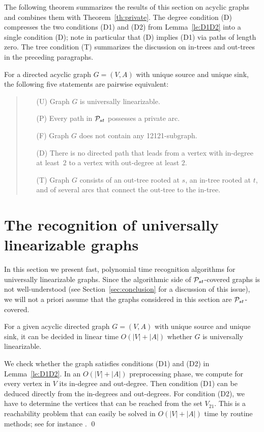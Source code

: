 \documentclass[11pt,fleqn]{article}
\begin{document}
\bigskip
The following theorem summarizes the results of this section on acyclic graphs and 
combines them with Theorem~\ref{th:private}.
The degree condition (D) compresses the two conditions (D1) and (D2) from Lemma~\ref{le:D1D2} into 
a single condition (D); note in particular that (D) implies (D1) via paths of length zero.
The tree condition (T) summarizes the discussion on in-trees and out-trees in the preceding paragraphs.
\begin{theorem}
\label{th:acyclic}
For a directed acyclic graph $G=(V,A)$ with unique source and unique sink, 
the following five statements are pairwise equivalent:
\begin{quote}
\begin{itemize}
\itemsep=0.9ex
\item[(U)] Graph $G$ is universally linearizable.
\item[(P)] Every path in ${\cal P}_{st}$ possesses a private arc.
\item[(F)] Graph $G$ does not contain any 12121-subgraph.
\item[(D)] There is no directed path that leads from a vertex with in-degree 
at least~$2$ to a vertex with out-degree at least $2$.
\item[(T)] Graph $G$ consists of an out-tree rooted at $s$, an in-tree rooted at $t$,
and of several arcs that connect the out-tree to the in-tree.
\end{itemize}
\end{quote}
\end{theorem}


\medskip
\section{The recognition of universally linearizable graphs}
\label{sec:algo}
In this section we present fast, polynomial time recognition algorithms for
universally linearizable graphs.
Since the algorithmic side of ${\cal P}_{st}$-covered graphs is not well-understood 
(see Section~\ref{sec:conclusion} for a discussion of this issue), we will not a priori 
assume that the graphs considered in this section are ${\cal P}_{st}$-covered.

\begin{lemma}
\label{le:algo-acyclic}
For a given acyclic directed graph $G=(V,A)$ with unique source and unique sink, 
it can be decided in linear time $O(|V|+|A|)$ whether $G$ is universally linearizable.
\end{lemma}
\proof
We check whether the graph satisfies conditions (D1) and (D2) in Lemma~\ref{le:D1D2}.
In an $O(|V|+|A|)$ preprocessing phase, we compute for every vertex in $V$ its in-degree and out-degree.
Then condition (D1) can be deduced directly from the in-degrees and out-degrees.
For condition (D2), we have to determine the vertices that can be reached from the set $V_{21}$.
This is a reachability problem that can easily be solved in $O(|V|+|A|)$ time by routine methods; 
see for instance \cite{CLRS}.
\qed
\end{document}
